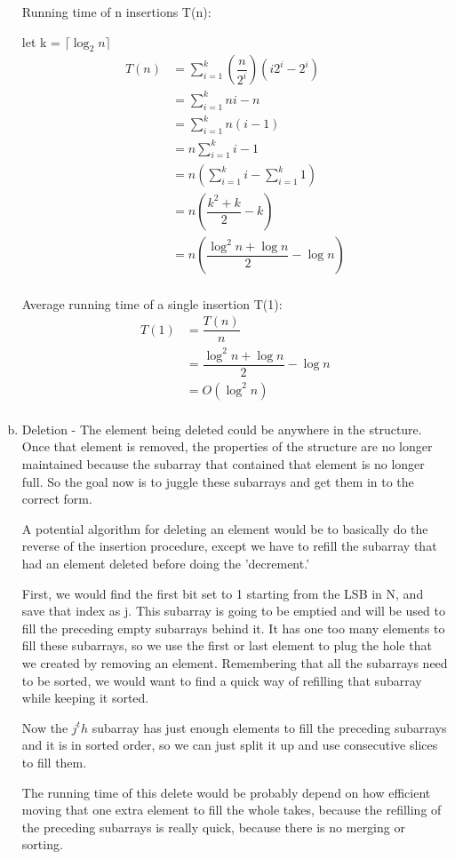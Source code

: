 \documentclass[a4paper,12pt]{article}
\begin{document}
\begin{enumerate}[a)]
  Running time of n insertions T(n):

  let k = \(\lceil \log_2 n \rceil\)
  \begin{align*}
    T(n)& = \sum_{i=1}^k (\dfrac{n}{2^i})(i2^i - 2^i)\\
    &= \sum_{i=1}^k ni - n\\
    &= \sum_{i=1}^k n(i - 1)\\
    &= n\sum_{i=1}^k i - 1\\
    &= n\left(\sum_{i=1}^k i - \sum_{i=1}^k 1\right)\\
    &= n\left( \dfrac{k^2 + k}{2} - k \right)\\
    &= n\left( \dfrac{\log^2 n + \log n}{2} - \log n \right)\\
  \end{align*}

  Average running time of a single insertion T(1):
  \begin{align*}
    T(1)& = \dfrac{T(n)}{n}\\
    &= \dfrac{\log^2 n + \log n}{2} - \log n\\
    &= O(\log^2 n)\\
  \end{align*}

  \item Deletion - The element being deleted could be anywhere in the structure. Once that element
      is removed, the properties of the structure are no longer maintained because the subarray
      that contained that element is no longer full. So the goal now is to juggle these subarrays
      and get them in to the correct form.

      \noindent A potential algorithm for deleting an element would be to basically do the reverse
      of the insertion procedure, except we have to refill the subarray that had an element deleted
      before doing the 'decrement.' 

      \noindent First, we would find the first bit set to 1 starting from the LSB in N, and save that index
      as j. This subarray is going to be emptied and will be used to fill the preceding empty subarrays
      behind it. It has one too many elements to fill these subarrays, so we use the first or last
      element to plug the hole that we created by removing an element. Remembering that all the 
      subarrays need to be sorted, we would want to find a quick way of refilling that subarray 
      while keeping it sorted.

      \noindent Now the \(j^th\) subarray has just enough elements to fill the preceding subarrays and it
      is in sorted order, so we can just split it up and use consecutive slices to fill them.

      \noindent The running time of this delete would be probably depend on how efficient moving that one
      extra element to fill the whole takes, because the refilling of the preceding subarrays is really
      quick, because there is no merging or sorting.

\end{enumerate}
\end{document}
